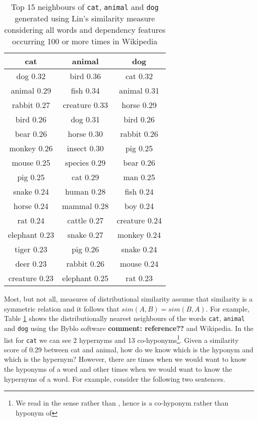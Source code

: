 \documentclass[11pt]{article}
\begin{document}
\begin{table}[ht]
\begin{tabular}{|c|c|c|}
\hline
cat&animal&dog\\
\hline
dog 0.32&bird 0.36&cat 0.32\\
animal 0.29&fish 0.34&animal 0.31\\
rabbit 0.27&creature 0.33&horse 0.29\\
bird 0.26&dog 0.31&bird 0.26\\
bear 0.26&horse 0.30&rabbit 0.26\\
monkey 0.26&insect 0.30&pig 0.25\\
mouse 0.25&species 0.29&bear 0.26\\
pig 0.25&cat 0.29&man 0.25\\
snake 0.24&human 0.28&fish 0.24\\
horse 0.24&mammal 0.28&boy 0.24\\
rat 0.24&cattle 0.27&creature 0.24\\
elephant 0.23&snake 0.27&monkey 0.24\\
tiger 0.23&pig 0.26&snake 0.24\\
deer 0.23&rabbit 0.26&mouse 0.24\\
creature 0.23&elephant 0.25&rat 0.23\\
\hline
\end{tabular}
\label{table:neighbours}
\caption{Top 15 neighbours of \texttt{cat}, \texttt{animal} and \texttt{dog} generated using Lin's similarity measure \cite{Lin1998} considering all words and dependency features occurring 100 or more times in Wikipedia}
\end{table}
Most, but not all, measures of distributional similarity assume that similarity is a symmetric relation and it follows that $sim(A,B) = sim(B,A)$.  For example, Table \ref{table:neighbours} shows the distributionally nearest neighbours of the words \texttt{cat}, \texttt{animal} and \texttt{dog} using the Byblo software {\bf comment: reference??} and Wikipedia.  In the list for \texttt{cat} we can see 2 hypernyms and 13 co-hyponyms\footnote{We read in the sense  rather than , hence  is a co-hyponym rather than hyponym of }.  Given a similarity score of 0.29 between cat and animal, how do we know which is the hyponym and which is the hypernym? However, there are times when we would want to know the hyponyms of a word and other times when we would want to know the hypernyms of a word.  For example, consider the following two sentences.
\end{document}
